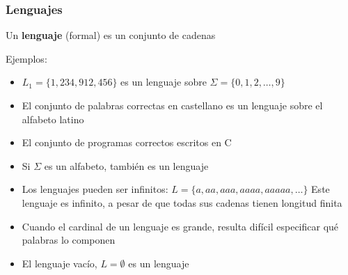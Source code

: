 \begin{frame}
  \frametitle{Lenguajes}
      \begin{defi}
			Un \textbf{lenguaje} (formal) es un conjunto de cadenas
			\end{defi}

\begin{block}{Ejemplos:}
\begin{itemize}[<+->]
\item $L_1 = \{1, 234, 912, 456\}$ es un lenguaje sobre $\Sigma = \{0, 1, 2, \ldots, 9\}$
\item El conjunto de palabras correctas en castellano es un lenguaje sobre el alfabeto latino
\item El conjunto de programas correctos escritos en C
\end{itemize}
\end{block}

\begin{itemize}[<+->]
\item Si $\Sigma$ es un alfabeto, también es un lenguaje
\item Los lenguajes pueden ser infinitos: $L = \{a, aa, aaa, aaaa, aaaaa, \ldots \}$
Este lenguaje es infinito, a pesar de que todas sus cadenas tienen longitud finita
\item Cuando el cardinal de un lenguaje es grande, resulta difícil especificar qué palabras lo componen
\item El lenguaje vacío, $L = \emptyset$ es un lenguaje
\end{itemize}
\end{frame}
